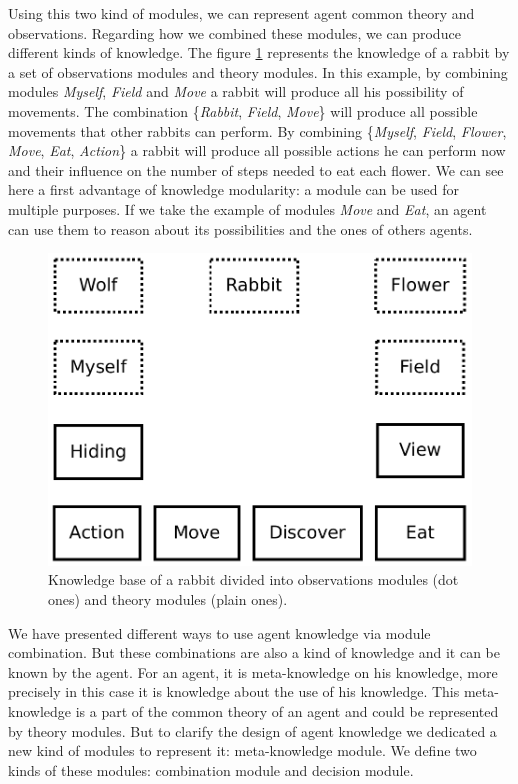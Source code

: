 \documentclass{aamas2012}
\begin{document}
	Using this two kind of modules, we can represent agent common theory and observations.
	Regarding how we combined these modules, we can produce different kinds of knowledge.
	The figure \ref{module_combination} represents the knowledge of a rabbit by a set of observations modules and theory modules.
	In this example, by combining modules \emph{Myself}, \emph{Field} and \emph{Move} a rabbit will produce all his possibility of movements.
	The combination \{\emph{Rabbit}, \emph{Field}, \emph{Move}\} will produce all possible movements that other rabbits can perform. 
	By combining \{\emph{Myself}, \emph{Field}, \emph{Flower}, \emph{Move}, \emph{Eat}, \emph{Action}\} 
	a rabbit will produce all possible actions he can perform now and their influence on the number of steps needed to eat each flower.
	We can see here a first advantage of knowledge modularity: a module can be used for multiple purposes.
	If we take the example of modules \emph{Move} and \emph{Eat}, an agent can use them to reason about its possibilities and the ones of others agents.
	
	\begin{figure}
		\centering
		\includegraphics[keepaspectratio=true, scale=0.4]{module_combination.pdf}
		\caption
		{
			\label{module_combination}
			Knowledge base of a rabbit divided into observations modules (dot ones) and theory modules (plain ones).
		}
	\end{figure}

	We have presented different ways to use agent knowledge via module combination.
	But these combinations are also a kind of knowledge and it can be known by the agent.
	For an agent, it is meta-knowledge on his knowledge, more precisely in this case it is knowledge about the use of his knowledge.
	This meta-knowledge is a part of the common theory of an agent and could be represented by theory modules.
	But to clarify the design of agent knowledge we dedicated a new kind of modules to represent it: meta-knowledge module.
	We define two kinds of these modules: combination module and decision module.
	
\end{document}
